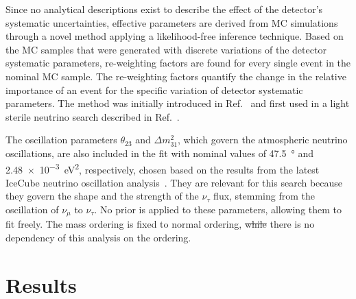 \documentclass[
    aps,
    prd,
    reprint,
    amsmath,
    amssymb,
    nofootinbib,
    superscriptaddress,
    floatfix
]{revtex4-2}
\providecommand{\DIFaddtex}[1]{{\protect\color{blue}\uwave{#1}}} %
\providecommand{\DIFdeltex}[1]{{\protect\color{red}\sout{#1}}}                      %
\providecommand{\DIFaddbegin}{} %
\providecommand{\DIFaddend}{} %
\providecommand{\DIFdelbegin}{} %
\providecommand{\DIFdelend}{} %
\providecommand{\DIFadd}[1]{\texorpdfstring{\DIFaddtex{#1}}{#1}} %
\providecommand{\DIFdel}[1]{\texorpdfstring{\DIFdeltex{#1}}{}} %
\newcommand{\DIFscaledelfig}{0.5}
\newlength{\DIFdelgraphicswidth} %
\newlength{\DIFdelgraphicsheight} %
\newcommand{\DIFaddincludegraphics}[2][]{{\color{blue}\fbox{\DIFOincludegraphics[#1]{#2}}}} %
\newcommand{\DIFdelincludegraphics}[2][]{%
\sbox{\DIFdelgraphicsbox}{\DIFOincludegraphics[#1]{#2}}%
\settoboxwidth{\DIFdelgraphicswidth}{\DIFdelgraphicsbox} %
\settoboxtotalheight{\DIFdelgraphicsheight}{\DIFdelgraphicsbox} %
\scalebox{\DIFscaledelfig}{%
\parbox[b]{\DIFdelgraphicswidth}{\usebox{\DIFdelgraphicsbox}\\[-\baselineskip] \rule{\DIFdelgraphicswidth}{0em}}\llap{\resizebox{\DIFdelgraphicswidth}{\DIFdelgraphicsheight}{%
\setlength{\unitlength}{\DIFdelgraphicswidth}%
\begin{picture}(1,1)%
\thicklines\linethickness{2pt} %
{\color[rgb]{1,0,0}\put(0,0){\framebox(1,1){}}}%
{\color[rgb]{1,0,0}\put(0,0){\line( 1,1){1}}}%
{\color[rgb]{1,0,0}\put(0,1){\line(1,-1){1}}}%
\end{picture}%
}\hspace*{3pt}}} %
} %
\DeclareRobustCommand{\DIFaddbegin}{\DIFOaddbegin \let\includegraphics\DIFaddincludegraphics} %
\DeclareRobustCommand{\DIFaddend}{\DIFOaddend \let\includegraphics\DIFOincludegraphics} %
\DeclareRobustCommand{\DIFdelbegin}{\DIFOdelbegin \let\includegraphics\DIFdelincludegraphics} %
\DeclareRobustCommand{\DIFdelend}{\DIFOaddend \let\includegraphics\DIFOincludegraphics} %
\begin{document}
Since no analytical descriptions exist to describe the effect of the detector's systematic uncertainties, effective \DIFaddbegin \DIFadd{re-weighting }\DIFaddend parameters are derived from MC simulations through a novel method applying a likelihood-free inference technique.
Based on the MC samples that were generated with discrete variations of the detector systematic parameters, re-weighting factors are found for every single event in the nominal MC sample.
The re-weighting factors quantify the change in the relative importance of an event for the specific variation of detector systematic parameters. The method was initially introduced in Ref.~\cite{Fischer_2023} and first used in a light sterile neutrino search described in Ref.~\cite{Abbasi:2024ktc}.

The oscillation parameters $\theta_{23}$ and $\Delta m^{2}_{31}$, which govern the atmospheric neutrino oscillations, are also included in the fit with nominal values of \SI{47.5}{\degree} and \SI{2.48e-3}{\electronvolt^2}, respectively, chosen based on the results from the latest IceCube neutrino oscillation analysis~\cite{IceCube:2024xjj}.
They are relevant for this search because they govern the shape and the strength of the $\nu_\tau$ flux, stemming from the oscillation of $\nu_\mu$ to $\nu_\tau$.
No prior is applied to these parameters, allowing them to fit freely.
The mass ordering is fixed to normal ordering, \DIFdelbegin \DIFdel{while }\DIFdelend \DIFaddbegin \DIFadd{since }\DIFaddend there is no dependency of this analysis on the ordering.




\section{\label{sec:results}Results}
\end{document}
